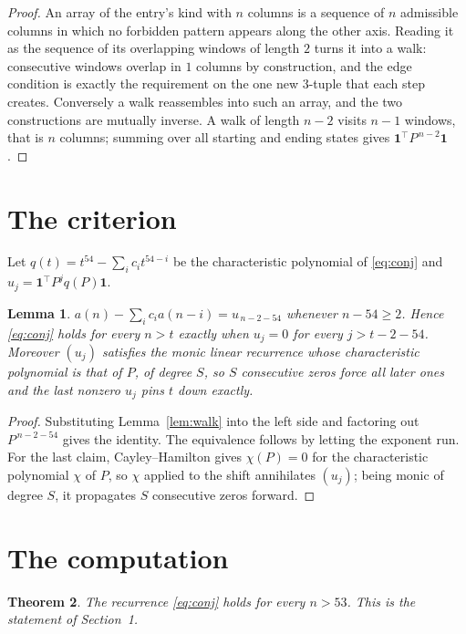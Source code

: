 \documentclass[11pt,a4paper]{article}
\theoremstyle{plain}
\newtheorem{theorem}{Theorem}
\newtheorem{lemma}[theorem]{Lemma}
\theoremstyle{definition}
\begin{document}
\begin{proof}
An array of the entry's kind with $n$ columns is a sequence of $n$ admissible columns in
which no forbidden pattern appears along the other axis. Reading it as the sequence of its
overlapping windows of length $2$ turns it into a walk: consecutive windows overlap in
$1$ columns by construction, and the edge condition is exactly the requirement on the one
new $3$-tuple that each step creates. Conversely a walk reassembles into such an array,
and the two constructions are mutually inverse. A walk of length $n-2$ visits $n-1$
windows, that is $n$ columns; summing over all starting and ending states gives
$\mathbf{1}^{\!\top}P^{\,n-2}\mathbf{1}$.
\end{proof}

\section{The criterion}

Let $q(t)=t^{54}-\sum_i c_i t^{54-i}$ be the characteristic polynomial of
\eqref{eq:conj} and $u_j=\mathbf{1}^{\!\top}P^{j}q(P)\mathbf{1}$.

\begin{lemma}\label{lem:crit}
$a(n)-\sum_i c_i a(n-i)=u_{\,n-2-54}$ whenever $n-54\ge2$. Hence
\eqref{eq:conj} holds for every $n>t$ exactly when $u_j=0$ for every
$j>t-2-54$. Moreover $(u_j)$ satisfies the monic linear recurrence whose
characteristic polynomial is that of $P$, of degree $S$, so $S$ consecutive zeros force all
later ones and the last nonzero $u_j$ pins $t$ down exactly.
\end{lemma}

\begin{proof}
Substituting Lemma~\ref{lem:walk} into the left side and factoring out
$P^{\,n-2-54}$ gives the identity. The equivalence follows by letting the exponent
run. For the last claim, Cayley--Hamilton gives $\chi(P)=0$ for the characteristic
polynomial $\chi$ of $P$, so $\chi$ applied to the shift annihilates $(u_j)$; being monic of
degree $S$, it propagates $S$ consecutive zeros forward.
\end{proof}

\section{The computation}

\begin{theorem}
The recurrence \eqref{eq:conj} holds for every $n>53$. This is the statement of
Section~1.
\end{theorem}
\end{document}
